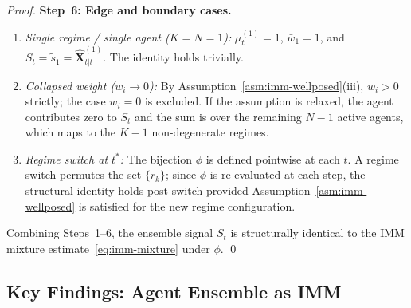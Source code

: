 \documentclass[12pt,openany]{book}
\numberwithin{equation}{chapter}
\theoremstyle{plain}
\theoremstyle{definition}
\theoremstyle{remark}
\begin{document}
\begin{proof}
\medskip
\noindent\textbf{Step~6: Edge and boundary cases.}
\begin{enumerate}
  \item \emph{Single regime / single agent ($K=N=1$):}
        $\mu_t^{(1)} = 1$, $\bar{w}_1 = 1$, and
        $S_t = \tilde{s}_1 = \hat{\mathbf{X}}_{t|t}^{(1)}$.
        The identity holds trivially.
  \item \emph{Collapsed weight ($w_i \to 0$):}
        By Assumption~\ref{asm:imm-wellposed}(iii), $w_i > 0$
        strictly; the case $w_i = 0$ is excluded.  If the
        assumption is relaxed, the agent contributes zero to
        $S_t$ and the sum is over the remaining $N-1$ active
        agents, which maps to the $K-1$ non-degenerate regimes.
  \item \emph{Regime switch at $t^*$:}  The bijection $\phi$
        is defined pointwise at each $t$.  A regime switch
        permutes the set $\{r_k\}$; since $\phi$ is
        re-evaluated at each step, the structural identity
        holds post-switch provided
        Assumption~\ref{asm:imm-wellposed} is satisfied for
        the new regime configuration.
\end{enumerate}

\noindent Combining Steps~1--6, the ensemble signal $S_t$ is
structurally identical to the IMM mixture
estimate~\eqref{eq:imm-mixture} under $\phi$. \qed
\end{proof}

\subsection*{Key Findings: Agent Ensemble as IMM}
\end{document}
